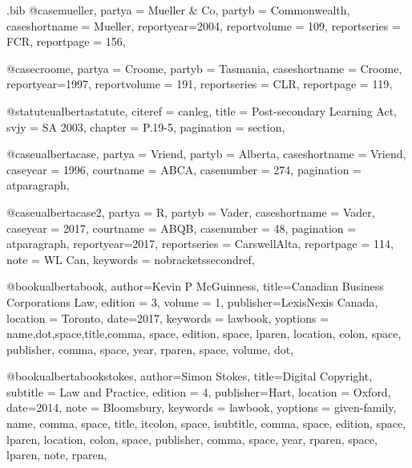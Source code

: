 \begin{filecontents*}[overwrite]{\jobname.bib}
@case{mueller,
  partya = {Mueller \& Co}, 
  partyb = {Commonwealth},
  caseshortname = {Mueller},
  reportyear={2004},
  reportvolume = {109},
  reportseries = {FCR},
  reportpage = {156},
	}


@case{croome,
  partya = {Croome}, 
  partyb = {Tasmania},
  caseshortname = {Croome},
  reportyear={1997},
  reportvolume = {191},
  reportseries = {CLR},
  reportpage = {119},
	}



@statute{ualbertastatute,
citeref = {canleg},
title = {Post-secondary Learning Act},
svjy = {SA 2003},
chapter = {P.19-5},
pagination = {section},
}

@case{ualbertacase,
  partya = {Vriend}, 
  partyb = {Alberta},
  caseshortname = {Vriend},
  caseyear = {1996},
  courtname = {ABCA},
  casenumber = {274},
  pagination = {atparagraph},
	}


@case{ualbertacase2,
  partya = {R}, 
  partyb = {Vader},
  caseshortname = {Vader},
  caseyear = {2017},
  courtname = {ABQB},
  casenumber = {48},
  pagination = {atparagraph},
  reportyear={2017},
  reportseries = {CarswellAlta},
  reportpage = {114},
  note = {WL Can},
  keywords = {nobracketssecondref},
}

@book{ualbertabook,
author={Kevin P McGuinness},
title={Canadian Business Corporations Law},
edition = {3},
volume = {1},
publisher={LexisNexis Canada},
location = {Toronto},
date={2017},
keywords = {lawbook},
yoptions = {name,dot,space,title,comma,
space,
edition,
space,
lparen, 
location,
colon,
space,
publisher,
comma,
space,
year,
rparen,
space,
volume,
dot},
}



@book{ualbertabookstokes,
author={Simon Stokes},
title={Digital Copyright},
subtitle = {Law and Practice},
edition = {4},
publisher={Hart},
location = {Oxford},
date={2014},
note = {Bloomsbury},
keywords = {lawbook},
yoptions = {given-family,
name,
comma,
space,
title,
itcolon,
space,
isubtitle,
comma,
space,
edition,
space,
lparen, 
location,
colon,
space,
publisher,
comma,
space,
year,
rparen,
space,
lparen,
note,
rparen},
}





\end{filecontents*}
